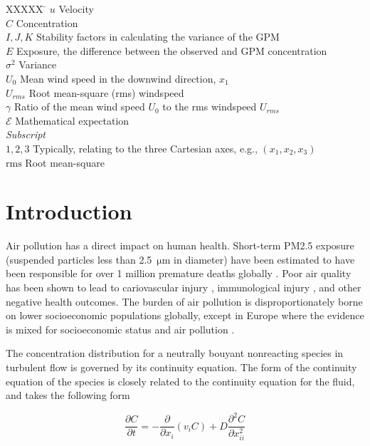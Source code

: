 \documentclass[]{aiaa-tc}%
\newcommand{\pd}[2]{\frac{\partial #1}{\partial #2}}
\newcommand{\pdn}[3]{\frac{\partial^{#3} #1}{\partial #2^{#3}}}
\newcommand{\unit}[1]{\, \mathrm{#1}}
\begin{document}
\begin{tabbing}
  XXXXX \= \kill%
  $u$ \> Velocity \\
  $C$ \> Concentration \\
  $I, J, K$ \> Stability factors in calculating the variance of the GPM \\
  $E$ \> Exposure, the difference between the observed and GPM concentration \\
  $\sigma^2$ \> Variance \\
  $U_0$ \> Mean wind speed in the downwind direction, $x_1$ \\
  $U_{rms}$ \> Root mean-square (rms) windspeed \\
  $\gamma$ \> Ratio of the mean wind speed $U_0$ to the rms windspeed $U_{rms}$ \\
  $\mathcal{E}$ \> Mathematical expectation \\
  \textit{Subscript}\\
  $1, 2, 3$ \> Typically, relating to the three Cartesian axes, e.g., $(x_1, x_2, x_3)$ \\
  $\mathrm{rms}$ \> Root mean-square
\end{tabbing}

\section{Introduction}

Air pollution has a direct impact on human health. Short-term PM2.5 exposure (suspended particles less than 2.5 $\unit{\mu m}$ in diameter) have been estimated to have been responsible for over 1 million premature deaths globally \cite{yu_estimates_2024}. Poor air quality has been shown to lead to cariovascular injury \cite{simkhovich_air_2008}, immunological injury \cite{bernstein_health_2004}, and other negative health outcomes. The burden of air pollution is disproportionately borne on lower socioeconomic populations globally, except in Europe where the evidence is mixed for socioeconomic status and air pollution \cite{hajat_socioeconomic_2015}.

The concentration distribution for a neutrally bouyant nonreacting species in turbulent flow is governed by its continuity equation. The form of the continuity equation of the species is closely related to the continuity equation for the fluid, and takes the following form \cite{bird_transport_1960}

\begin{equation} \label{eq:turb-cont}
  \pd{C}{t} = -\pd{}{x_i} \left( v_i C \right) + D \pdn{C}{x_{ii}}{2}
\end{equation}
\end{document}

